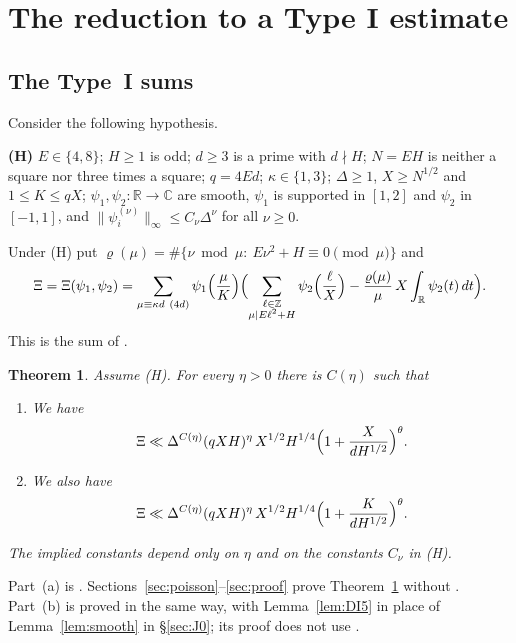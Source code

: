 \documentclass[11pt]{amsart}
\newtheorem{theorem}{Theorem}[section]
\theoremstyle{remark}
\theoremstyle{definition}
\numberwithin{equation}{section}
\newcommand{\Z}{\mathbb{Z}}
\newcommand{\R}{\mathbb{R}}
\newcommand{\C}{\mathbb{C}}
\begin{document}
\section{The reduction to a Type I estimate}\label{sec:reduction}

\subsection{The Type~I sums}
Consider the following hypothesis.

\medskip
\noindent\textbf{(H)} $E\in\{4,8\}$; $H\ge1$ is odd; $d\ge3$ is a prime with $d\nmid H$; $N=EH$ is neither a square nor three times a square; $q=4Ed$; $\kappa\in\{1,3\}$; $\Delta\ge1$, $X\ge N^{1/2}$ and $1\le K\le qX$; $\psi_1,\psi_2:\R\to\C$ are smooth, $\psi_1$ is supported in $[1,2]$ and $\psi_2$ in $[-1,1]$, and $\|\psi_i^{(\nu)}\|_\infty\le C_\nu\Delta^\nu$ for all $\nu\ge0$.
\medskip

Under (H) put $\varrho(\mu)=\#\{\nu\bmod\mu:\ E\nu^2+H\equiv0\pmod\mu\}$ and
\begin{equation}\label{eq:Xi}
\Xi=\Xi(\psi_1,\psi_2)=\sum_{\mu\equiv\kappa d\ (4d)}\psi_1\Bigl(\frac\mu K\Bigr)\Bigl(\sum_{\substack{\ell\in\Z\\ \mu\mid E\ell^2+H}}\psi_2\Bigl(\frac\ell X\Bigr)-\frac{\varrho(\mu)}{\mu}\,X\int_\R\psi_2(t)\,dt\Bigr).
\end{equation}
This is the sum of \cite[Proposition~6.5]{II}.

\begin{theorem}\label{thm:typeI}
Assume \textup{(H)}. For every $\eta>0$ there is $C(\eta)$ such that
\begin{enumerate}
\item[(a)] We have
\[
\Xi\ll\Delta^{C(\eta)}(qXH)^{\eta}\,X^{1/2}H^{1/4}\Bigl(1+\frac{X}{dH^{1/2}}\Bigr)^{\theta}.
\]
\item[(b)] We also have
\[
\Xi\ll\Delta^{C(\eta)}(qXH)^{\eta}\,X^{1/2}H^{1/4}\Bigl(1+\frac{K}{dH^{1/2}}\Bigr)^{\theta}.
\]
\end{enumerate}
The implied constants depend only on $\eta$ and on the constants $C_\nu$ in \textup{(H)}.
\end{theorem}

Part~(a) is \cite[Proposition~6.5]{II}. Sections~\ref{sec:poisson}--\ref{sec:proof} prove Theorem~\ref{thm:typeI} without \cite{GM1,GM2}. Part~(b) is proved in the same way, with Lemma~\ref{lem:DI5} in place of Lemma~\ref{lem:smooth} in \S\ref{sec:J0}; its proof does not use \cite{Pas}.
\end{document}
